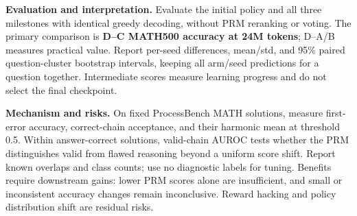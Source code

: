 \documentclass{article}
\begin{document}
\textbf{Evaluation and interpretation.} Evaluate the initial policy and all three milestones with identical greedy decoding, without PRM reranking or voting. The primary comparison is \textbf{D--C MATH500 accuracy at 24M tokens}; D--A/B measures practical value. Report per-seed differences, mean/std, and 95\% paired question-cluster bootstrap intervals, keeping all arm/seed predictions for a question together. Intermediate scores measure learning progress and do not select the final checkpoint.

\textbf{Mechanism and risks.} On fixed ProcessBench MATH solutions, measure first-error accuracy, correct-chain acceptance, and their harmonic mean at threshold 0.5. Within answer-correct solutions, valid-chain AUROC tests whether the PRM distinguishes valid from flawed reasoning beyond a uniform score shift. Report known overlaps and class counts; use no diagnostic labels for tuning. Benefits require downstream gains: lower PRM scores alone are insufficient, and small or inconsistent accuracy changes remain inconclusive. Reward hacking and policy distribution shift are residual risks.
\end{document}
